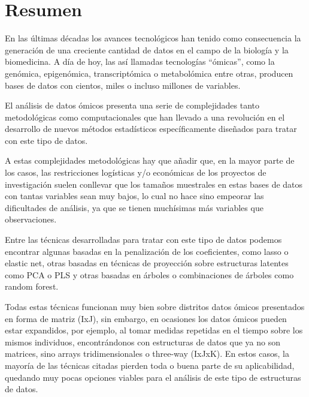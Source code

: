 
\chapter*{Resumen}


En las últimas décadas los avances tecnológicos han tenido como consecuencia la generación de una creciente cantidad de datos en el campo de la biología y la biomedicina. A día de hoy, las así llamadas tecnologías “ómicas”, como la genómica, epigenómica, transcriptómica o metabolómica entre otras, producen bases de datos con cientos, miles o incluso millones de variables. 

El análisis de datos ómicos presenta una serie de complejidades tanto metodológicas como computacionales que han llevado a una revolución en el desarrollo de nuevos métodos estadísticos específicamente diseñados para tratar con este tipo de datos. 

A estas complejidades metodológicas hay que añadir que, en la mayor parte de los casos, las restricciones logísticas y/o económicas de los proyectos de investigación suelen conllevar que los tamaños muestrales en estas bases de datos con tantas variables sean muy bajos, lo cual no hace sino empeorar las dificultades de análisis, ya que se tienen muchísimas más variables que observaciones.

Entre las técnicas desarrolladas para tratar con este tipo de datos podemos encontrar algunas basadas en la penalización de los coeficientes, como lasso o elastic net, otras basadas en técnicas de proyección sobre estructuras latentes como PCA o PLS y otras basadas en árboles o combinaciones de árboles como random forest.

Todas estas técnicas funcionan muy bien sobre distritos datos ómicos presentados en forma de matriz (IxJ), sin embargo, en ocasiones los datos ómicos pueden estar expandidos, por ejemplo, al tomar medidas repetidas en el tiempo sobre los mismos individuos, encontrándonos con estructuras de datos que ya no son matrices, sino arrays tridimensionales o three-way (IxJxK). En estos casos, la mayoría de las técnicas citadas pierden toda o buena parte de su aplicabilidad, quedando muy pocas opciones viables para el análisis de este tipo de estructuras de datos.


